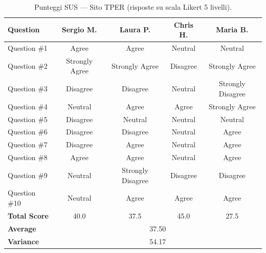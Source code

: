 \documentclass[11pt,a4paper]{article}
\begin{document}
\begin{table}[ht]
\centering
\label{tab:sus_scores}
\renewcommand{\arraystretch}{1.3}
\begin{tabular}{|l|c|c|c|c|}
\hline
\textbf{Question} & \textbf{Sergio M.} & \textbf{Laura P.} & \textbf{Chris H.} & \textbf{Maria B.} \\ \hline
Question \#1      & Agree          & Agree          & Neutral        & Neutral          \\ \hline
Question \#2      & Strongly Agree & Strongly Agree & Disagree       & Strongly Agree   \\ \hline
Question \#3      & Disagree       & Disagree       & Neutral        & Strongly Disagree \\ \hline
Question \#4      & Neutral        & Agree          & Agree          & Strongly Agree   \\ \hline
Question \#5      & Disagree       & Neutral        & Neutral        & Neutral          \\ \hline
Question \#6      & Disagree       & Disagree       & Neutral        & Agree            \\ \hline
Question \#7      & Disagree       & Agree          & Neutral        & Agree            \\ \hline
Question \#8      & Agree          & Agree          & Neutral        & Agree            \\ \hline
Question \#9      & Neutral        & Strongly Disagree & Disagree    & Disagree         \\ \hline
Question \#10     & Neutral        & Agree          & Agree          & Agree            \\ \hline
\textbf{\hfill Total Score} & 40.0   & 37.5          & 45.0          & 27.5             \\ \hline
\textbf{\hfill Average}     & \multicolumn{4}{c|}{37.50}                               \\ \hline
\textbf{\hfill Variance}    & \multicolumn{4}{c|}{54.17}                               \\ \hline
\end{tabular}
\caption{Punteggi SUS — Sito TPER (risposte su scala Likert 5 livelli).}
\end{table}

\vspace{0.5cm}
\end{document}
